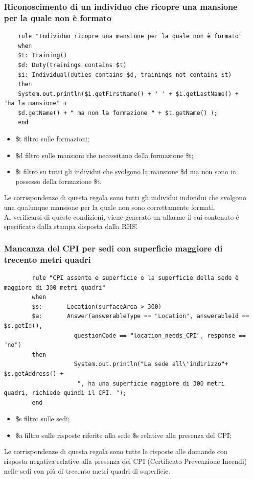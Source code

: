 \subsubsection{Riconoscimento di un individuo che ricopre una mansione per la quale non è formato}
	\label{Drools:regolaMansioniFormazioni}
	\begin{verbatim}
	rule "Individuo ricopre una mansione per la quale non è formato"
	when
	$t: Training()
	$d: Duty(trainings contains $t)
	$i: Individual(duties contains $d, trainings not contains $t)
	then
	System.out.println($i.getFirstName() + ' ' + $i.getLastName() + "ha la mansione" +
	$d.getName() + " ma non la formazione " + $t.getName() );
	end
	\end{verbatim}
	\begin{itemize}
		\item \$t filtro sulle formazioni;
		\item \$d filtro sulle mansioni che necessitano della formazione \$t;
		\item \$i filtro su tutti gli individui che svolgono la mansione \$d ma non sono in possesso della formazione \$t.
	\end{itemize}
	Le corrispondenze di questa regola sono tutti gli individui individui che svolgono una qualunque mansione per la quale non sono correttamente formati.\\
	Al verificarsi di queste condizioni, viene generato un allarme il cui contenuto è specificato dalla stampa disposta dalla \gls{RHS}\G.
	
\subsubsection{Mancanza del CPI per sedi con superficie maggiore di trecento metri quadri}
\label{Drools:regolaCPISuperficie}

	\begin{verbatim}
		rule "CPI assente e superficie e la superficie della sede è  maggiore di 300 metri quadri"
		when
		$s: 	  Location(surfaceArea > 300)
		$a: 	  Answer(answerableType == "Location", answerableId == $s.getId(), 
					questionCode == "location_needs_CPI", response == "no")
		then
					System.out.println("La sede all\'indirizzo"+ $s.getAddress() +
					 ", ha una superficie maggiore di 300 metri quadri, richiede quindi il CPI. ");
		end
	\end{verbatim}

	\begin{itemize}
		\item \$s filtro sulle sedi;
		\item \$a filtro sulle risposte riferite alla sede \$s relative alla presenza del \gls{CPI}\G;
	\end{itemize}
	Le corrispondenze di questa regola sono tutte le risposte alle domande con risposta negativa relative alla presenza del CPI (Certificato Prevenzione Incendi) nelle sedi con più di trecento metri quadri di superficie.

